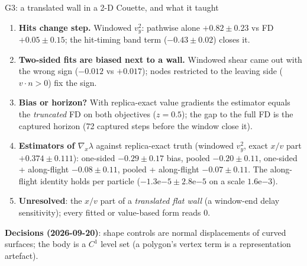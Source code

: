 \documentclass[10pt,aspectratio=169]{beamer}
\begin{document}
\begin{frame}{G3: a translated wall in a 2-D Couette, and what it taught}
\footnotesize
\begin{enumerate}
\item \textbf{Hits change step.}  Windowed $v_y^2$: pathwise alone $+0.82\pm0.23$ vs FD
  $+0.05\pm0.15$; the hit-timing band term ($-0.43\pm0.02$) closes it.
\item \textbf{Two-sided fits are biased next to a wall.}  Windowed shear came out with the wrong sign
  ($-0.012$ vs $+0.017$); nodes restricted to the leaving side ($v\cdot n > 0$) fix the sign.
\item \textbf{Bias or horizon?}  With replica-exact value gradients the estimator equals the
  \emph{truncated} FD on both objectives ($z = 0.5$); the gap to the full FD is the captured
  horizon (72 captured steps before the window close it).
\item \textbf{Estimators of $\nabla_x\lambda$} against replica-exact truth (windowed $v_y^2$, exact
  $x/v$ part $+0.374\pm0.111$): one-sided $-0.29\pm0.17$ bias, pooled $-0.20\pm0.11$, one-sided +
  along-flight $-0.08\pm0.11$, pooled + along-flight $-0.07\pm0.11$.  The along-flight identity holds
  per particle ($-1.3\mathrm{e}{-5}\pm2.8\mathrm{e}{-5}$ on a scale $1.6\mathrm{e}{-3}$).
\item \textbf{Unresolved}: the $x/v$ part of a \emph{translated flat wall} (a window-end delay
  sensitivity); every fitted or value-based form reads 0.
\end{enumerate}
\textbf{Decisions (2026-09-20)}: shape controls are normal displacements of curved surfaces; the
body is a $C^1$ level set (a polygon's vertex term is a representation artefact).
\end{frame}
\end{document}

